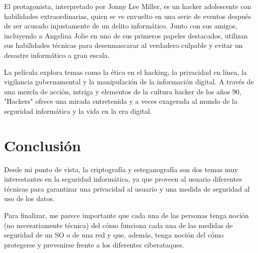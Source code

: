 \documentclass[12pt, a4paper]{article} %
\begin{document}
El protagonista, interpretado por Jonny Lee Miller, es un hacker adolescente con habilidades extraordinarias, quien se ve envuelto en una serie de eventos después de ser acusado injustamente de un delito informático. Junto con sus amigos, incluyendo a Angelina Jolie en uno de sus primeros papeles destacados, utilizan sus habilidades técnicas para desenmascarar al verdadero culpable y evitar un desastre informático a gran escala.

La película explora temas como la ética en el hacking, la privacidad en línea, la vigilancia gubernamental y la manipulación de la información digital. A través de una mezcla de acción, intriga y elementos de la cultura hacker de los años 90, "Hackers" ofrece una mirada entretenida y a veces exagerada al mundo de la seguridad informática y la vida en la era digital.

\clearpage
\section{Conclusión}

Desde mi punto de vista, la criptografía y esteganografía son dos temas muy interestantes en la seguridad informática, ya que proveen al usuario diferentes técnicas para garantizar una privacidad al usuario y una medida de seguridad al uso de los datos.

Para finalizar, me parece importante que cada una de las personas tenga noción (no necesariamente técnica) del cómo funciona cada una de las medidas de seguridad de un SO o de una red y que, además, tenga noción del cómo protegerse y prevenirse frente a los diferentes ciberataques.


\nocite{*} %

\clearpage



\end{document}
